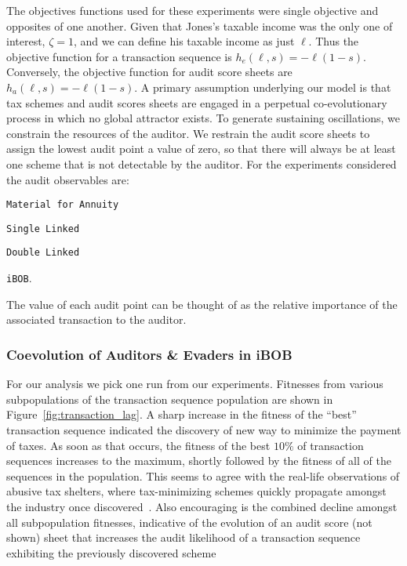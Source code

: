 The objectives functions used for these experiments were single
objective and opposites of one another. Given that Jones's taxable
income was the only one of interest, $\zeta = 1$, and we can define
his taxable income as just $\ell$. Thus the objective function for a
transaction sequence is $h_e(\ell, s) = -\ell(1-s)$. Conversely, the
objective function for audit score sheets are $h_a(\ell, s) = -
\ell(1-s)$. A primary assumption underlying our model is that tax
schemes and audit scores sheets are engaged in a perpetual
co-evolutionary process in which no global attractor exists. To
generate sustaining oscillations, we constrain the resources of the
auditor. We restrain the audit score sheets to assign the lowest audit
point a value of zero, so that there will always be at least one
scheme that is not detectable by the auditor. For the experiments
considered the audit observables are:
\begin{inparaenum}
\item \texttt{Material for Annuity}
\item \texttt{Single Linked}
\item \texttt{Double Linked}
\item \texttt{iBOB}.
\end{inparaenum}
The value of each audit point can be thought of as the relative
importance of the associated transaction to the auditor.

\subsubsection{Coevolution of Auditors \& Evaders in iBOB}

For our analysis we pick one run from our experiments. Fitnesses from
various subpopulations of the transaction sequence population are
shown in Figure~\ref{fig:transaction_lag}. A sharp increase in the
fitness of the ``best'' transaction sequence indicated the discovery
of new way to minimize the payment of taxes. As soon as that occurs,
the fitness of the best $10\%$ of transaction sequences increases to
the maximum, shortly followed by the fitness of all of the sequences
in the population. This seems to agree with the real-life observations
of abusive tax shelters, where tax-minimizing schemes quickly
propagate amongst the industry once
discovered~\cite{wright45financial, confidencegames}. Also encouraging
is the combined decline amongst all subpopulation fitnesses,
indicative of the evolution of an audit score (not shown) sheet that
increases the audit likelihood of a transaction sequence exhibiting
the previously discovered scheme

